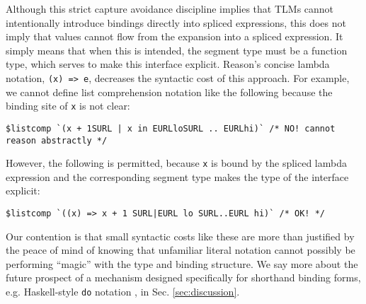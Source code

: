 \documentclass[acmsmall,screen]{acmart}
\newcommand{\li}[1]{\lstinline[basicstyle=\ttfamily\fontsize{9pt}{1em}\selectfont]{#1}}
\begin{document}

Although this strict capture avoidance discipline implies that TLMs cannot intentionally introduce  bindings directly into spliced expressions, this does not imply that values cannot flow from the expansion into a spliced expression. It simply means that when this is intended, the segment type must be a function type, which serves to make this interface explicit. Reason's concise lambda notation, \li{(x) => e}, decreases the syntactic cost of this approach. For example, we cannot define list comprehension notation like the following because the binding site of \li{x} is not clear:
\begin{lstlisting}[numbers=none,deletekeywords={in}]
  $listcomp `(x + 1SURL | x in EURLloSURL .. EURLhi)` /* NO! cannot reason abstractly */
\end{lstlisting}
However, the following is permitted, because \li{x} is bound by the spliced lambda expression and the corresponding segment type makes the type of the interface explicit:
\begin{lstlisting}[numbers=none]
  $listcomp `((x) => x + 1 SURL|EURL lo SURL..EURL hi)` /* OK! */
\end{lstlisting}

Our contention is that small syntactic costs like these are more than justified by the peace of mind of knowing that unfamiliar literal notation cannot possibly be performing ``magic'' with the type and binding structure. We say more about the future prospect of a  mechanism designed specifically for shorthand binding forms, e.g. Haskell-style \li{do} notation \cite{jones2003haskell}, in Sec. \ref{sec:discussion}.%



\end{document}
